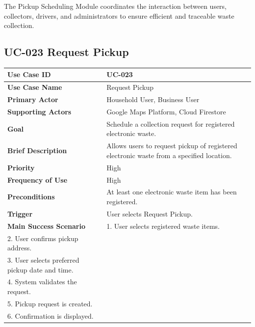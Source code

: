 The Pickup Scheduling Module coordinates the interaction between users,
collectors, drivers, and administrators to ensure efficient and
traceable waste collection.

\subsection{UC-023 Request Pickup}

\begin{longtable}{|p{4cm}|p{10cm}|}

\hline
\textbf{Use Case ID} &
UC-023 \\
\hline

\textbf{Use Case Name} &
Request Pickup \\
\hline

\textbf{Primary Actor} &
Household User, Business User \\
\hline

\textbf{Supporting Actors} &
Google Maps Platform, Cloud Firestore \\
\hline

\textbf{Goal} &
Schedule a collection request for registered electronic waste. \\
\hline

\textbf{Brief Description} &
Allows users to request pickup of registered electronic waste from a
specified location. \\
\hline

\textbf{Priority} &
High \\
\hline

\textbf{Frequency of Use} &
High \\
\hline

\textbf{Preconditions} &
At least one electronic waste item has been registered. \\
\hline

\textbf{Trigger} &
User selects Request Pickup. \\
\hline

\textbf{Main Success Scenario} &
1. User selects registered waste items.\\
2. User confirms pickup address.\\
3. User selects preferred pickup date and time.\\
4. System validates the request.\\
5. Pickup request is created.\\
6. Confirmation is displayed.\\
\hline


\end{longtable}
